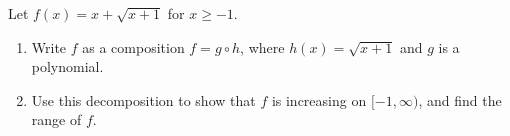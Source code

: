 Let $f(x)=x+\sqrt{x+1}$ for $x\ge-1$.
\begin{enumerate}
\item[(a)] Write $f$ as a composition $f=g\circ h$, where $h(x)=\sqrt{x+1}$ and $g$ is a polynomial.
\item[(b)] Use this decomposition to show that $f$ is increasing on $[-1,\infty)$, and find the range of $f$.
\end{enumerate}
